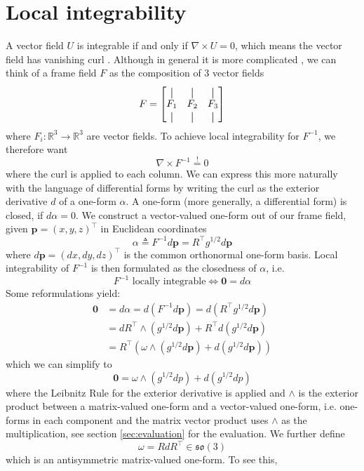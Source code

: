 \documentclass[../thesis.tex]{subfiles}
\begin{document}
\section{Local integrability}
A vector field $U$ is integrable if and only if $\nabla \times U = 0$,
which means the vector field has vanishing curl \cite{Pap20}.
Although in general it is more complicated \cite{Nieser}, we can think of a frame field $F$ as the composition of 3 vector fields
$$F = \begin{bmatrix}
  \vertbar & \vertbar & \vertbar \\
  F_1 & F_2 & F_3 \\
  \vertbar & \vertbar & \vertbar
\end{bmatrix}$$
where $F_i : \mathbb{R}^3 \to \mathbb{R}^3$ are vector fields.
To achieve local integrability for $F^{-1}$, we therefore want
$$\nabla \times F^{-1} \overset{!}{=}0$$
where the curl is applied to each column.
We can express this more naturally with the language of differential forms by writing
the curl as the exterior derivative $d$ of a one-form $\alpha$.
A one-form (more generally, a differential form) is closed, if $d\alpha = 0$.
We construct a vector-valued one-form out of our frame field,
given $\bm{p}=(x,y,z)^{\top}$ in Euclidean coordinates
$$\alpha \triangleq F^{-1}d\bm{p} = R^{\top}g^{1/2}d\bm{p}$$
where $d\bm{p} = (dx,dy,dz)^{\top}$ is the common orthonormal one-form basis.
Local integrability of $F^{-1}$ is then formulated as the closedness of $\alpha$, i.e.
$$F^{-1} \text{ locally integrable} \iff \bm{0} = d\alpha$$
Some reformulations yield:
\begin{align*}
  \bm{0} &= d\alpha = d(F^{-1}d\bm{p}) = d(R^{\top}g^{1/2}d\bm{p})\\
  &= dR^{\top} \wedge  (g^{1/2}d\bm{p}) + R^{\top}d(g^{1/2}d\bm{p}) \\
  &= R^{\top}(\omega \wedge (g^{1/2}d\bm{p})+ d(g^{1/2}d\bm{p}))
\end{align*}
which we can simplify to
\begin{equation}\label{eq:oneform}
  \bm{0} = \omega \wedge (g^{1/2}dp)+ d(g^{1/2}dp)
\end{equation}
where the Leibnitz Rule for the exterior derivative is applied
and $\wedge$ is the exterior product between a matrix-valued one-form and a vector-valued one-form,
i.e. one-forms in each component and the matrix vector product uses $\wedge$
as the multiplication, see section \ref{sec:evaluation} for the evaluation.
We further define
$$\omega = RdR^{\top} \in \mathfrak{so}(3)$$
which is an antisymmetric matrix-valued one-form. To see this, 
\end{document}
